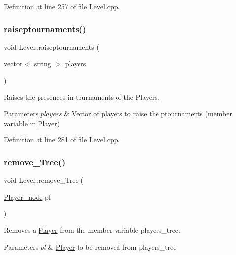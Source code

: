 Definition at line 257 of file Level.\+cpp.

\hypertarget{class_level_ac592cc97524f49de9114f4af20312aad}{}\label{class_level_ac592cc97524f49de9114f4af20312aad} 
\subsubsection{\texorpdfstring{raiseptournaments()}{raiseptournaments()}}
{\footnotesize\ttfamily void Level\+::raiseptournaments (\begin{DoxyParamCaption}\item[{vector$<$ string $>$}]{players }\end{DoxyParamCaption})}



Raises the presences in tournaments of the Players. 


\begin{DoxyParams}{Parameters}
{\em players} & Vector of players to raise the ptournaments (member variable in \hyperlink{class_player}{Player}) \\
\hline
\end{DoxyParams}


Definition at line 281 of file Level.\+cpp.

\hypertarget{class_level_a2752e4f84d3de5e8b72e4cf87cb0131b}{}\label{class_level_a2752e4f84d3de5e8b72e4cf87cb0131b} 
\subsubsection{\texorpdfstring{remove\+\_\+\+Tree()}{remove\_Tree()}}
{\footnotesize\ttfamily void Level\+::remove\+\_\+\+Tree (\begin{DoxyParamCaption}\item[{\hyperlink{struct_player__node}{Player\+\_\+node}}]{pl }\end{DoxyParamCaption})\hspace{0.3cm}{\ttfamily [inline]}}



Removes a \hyperlink{class_player}{Player} from the member variable players\+\_\+tree. 


\begin{DoxyParams}{Parameters}
{\em pl} & \hyperlink{class_player}{Player} to be removed from players\+\_\+tree \\
\hline
\end{DoxyParams}


